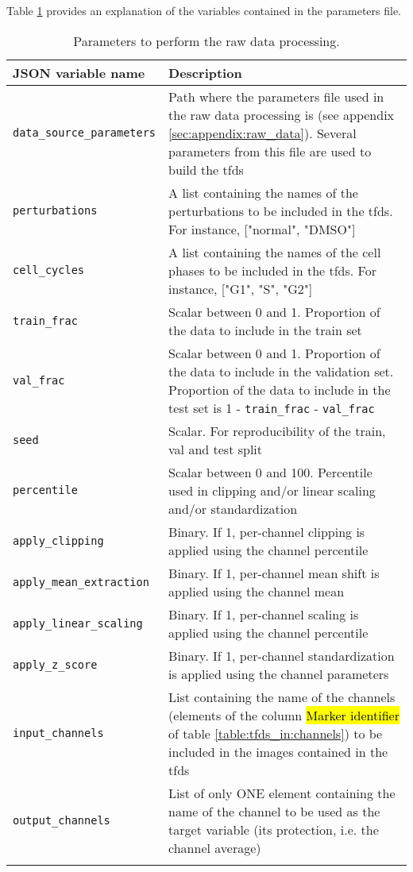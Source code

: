 Table \ref{table:tfds_in:params} provides an explanation of the variables contained in the parameters file.

\setlength{\mylinewidth}{\linewidth-7pt}%
\setlength{\mylengtha}{0.35\mylinewidth-2\arraycolsep}%
\setlength{\mylengthb}{0.65\mylinewidth-2\arraycolsep}%

\begin{longtable}{>{\centering\arraybackslash}m{\mylengtha} | m{\mylengthb}}
    \hline
    JSON variable name & Description \\
    \hline
    \texttt{data\_source\_parameters} & Path where the parameters file used in the raw data processing is (see appendix \ref{sec:appendix:raw_data}). Several parameters from this file are used to build the \gls{tfds} \\
    \hline
    \texttt{perturbations} & A list containing the names of the perturbations to be included in the \gls{tfds}. For instance, ["normal", "DMSO"] \\
    \hline
    \texttt{cell\_cycles} & A list containing the names of the cell phases to be included in the \gls{tfds}. For instance, ["G1", "S", "G2"] \\
    \hline
    \texttt{train\_frac} & Scalar between 0 and 1. Proportion of the data to include in the train set \\
    \hline
    \texttt{val\_frac} & Scalar between 0 and 1. Proportion of the data to include in the validation set. Proportion of the data to include in the test set is 1 - \texttt{train\_frac} - \texttt{val\_frac} \\
    \hline
    \texttt{seed} & Scalar. For reproducibility of the train, val and test split \\
    \hline
    \texttt{percentile} & Scalar between 0 and 100. Percentile used in clipping and/or linear scaling and/or standardization \\
    \hline
    \texttt{apply\_clipping} & Binary. If 1, per-channel clipping is applied using the channel percentile \\
    \hline
    \texttt{apply\_mean\_extraction} & Binary. If 1, per-channel mean shift is applied using the channel mean  \\
    \hline
    \texttt{apply\_linear\_scaling} & Binary. If 1, per-channel scaling is applied using the channel percentile \\
    \hline
    \texttt{apply\_z\_score} & Binary. If 1, per-channel standardization is applied using the channel parameters \\
    \hline
    \texttt{input\_channels} & List containing the name of the channels (elements of the column \hl{Marker identifier} of table \ref{table:tfds_in:channels}) to be included in the images contained in the \gls{tfds} \\
    \hline
    \texttt{output\_channels} & List of only ONE element containing the name of the channel to be used as the target variable (its protection, i.e. the channel average) \\
    \hline
  \caption{Parameters to perform the raw data processing.}
  \label{table:tfds_in:params}
\end{longtable}

